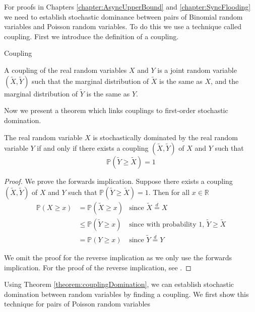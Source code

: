 For proofs in Chapters \ref{chapter:AsyncUpperBound} and \ref{chapter:SyncFlooding} we need to establish stochastic dominance between pairs of Binomial random variables and Poisson random variables. To do this we use a technique called coupling. First we introduce the definition of a coupling.

\begin{definition} %
	Coupling

	\noindent
	A  coupling of the real random variables $X$ and $Y$ is a joint random variable $(\tilde{X}, \tilde{Y})$ such that the marginal distribution of $\tilde{X}$ is the same as $X$, and the marginal distribution of $\tilde{Y}$ is the same as $Y$.
\end{definition}


Now we present a theorem which links couplings to first-order stochastic domination.

\begin{theorem}\label{theorem:couplingDomination}
	The real random variable $X$ is stochastically dominated by the real random variable $Y$ if and only if there exists a coupling $(\tilde{X}, \tilde{Y})$ of $X$ and $Y$ such that
	$$
		\mathbb{P}(\tilde{Y} \geq \tilde{X}) = 1
	$$
\end{theorem}

\begin{proof}
	We prove the forwards implication. Suppose there exists a coupling $(\tilde{X}, \tilde{Y})$ of $X$ and $Y$ such that $\mathbb{P}(\tilde{Y} \geq \tilde{X}) = 1$. Then for all $x \in \mathbb{R}$
	\begin{align*}
		\mathbb{P}(X \geq x) &= \mathbb{P}(\tilde{X} \geq x) & \text{since } \tilde{X} \stackrel{d}{=} X \\
		&\leq \mathbb{P}(\tilde{Y} \geq x) & \text{since with probability 1, } \tilde{Y} \geq \tilde{X} \\
		&= \mathbb{P}(Y \geq x) & \text{since } \tilde{Y} \stackrel{d}{=} Y 
	\end{align*}

	We omit the proof for the reverse implication as we only use the forwards implication. For the proof of the reverse implication, see \cite{coupling}.
\end{proof}


Using Theorem \ref{theorem:couplingDomination}, we can establish stochastic domination between random variables by finding a coupling. We first show this technique	for pairs of Poisson random variables

